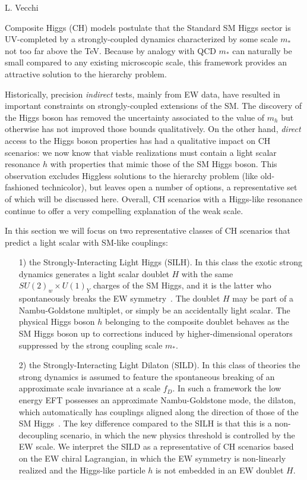 \begin{center}
 {L. Vecchi}
\end{center}
\label{sec9:CHM}

Composite Higgs (CH) models postulate that the Standard SM Higgs sector is UV-completed by a strongly-coupled dynamics characterized by some scale $m_*$ not too far above the TeV. Because by analogy with QCD $m_*$ can naturally be small compared to any existing microscopic scale, this framework provides an attractive solution to the hierarchy problem. 

Historically, precision {\emph{indirect}} tests, mainly from EW data, have resulted in important constraints on strongly-coupled extensions of the SM. The discovery of the Higgs boson has removed the uncertainty associated to the value of $m_h$ but otherwise has not improved those bounds qualitatively. On the other hand, {\emph{direct}} access to the Higgs boson properties has had a qualitative impact on CH scenarios: we now know that viable realizations must contain a light scalar resonance $h$ with properties that mimic those of the SM Higgs boson. This observation excludes Higgless solutions to the hierarchy problem (like old-fashioned technicolor), but leaves open a number of options, a representative set of which will be discussed here. Overall, CH scenarios with a Higgs-like resonance continue to offer a very compelling explanation of the weak scale.




In this section we will focus on two representative classes of CH scenarios that predict a light scalar with SM-like couplings:
\begin{itemize}
\item[1)] the Strongly-Interacting Light Higgs (SILH). In this class the exotic strong dynamics generates a light scalar doublet $H$ with the same $SU(2)_w\times U(1)_Y$ charges of the SM Higgs, and it is the latter who spontaneously breaks the EW symmetry~\cite{Kaplan:1983fs, Kaplan:1983sm}. The doublet $H$ may be part of a Nambu-Goldstone multiplet, or simply be an accidentally light scalar. The physical Higgs boson $h$ belonging to the composite doublet behaves as the SM Higgs boson up to corrections induced by higher-dimensional operators suppressed by the strong coupling scale $m_*$. 
\item[2)] the Strongly-Interacting Light Dilaton (SILD). In this class of theories the strong dynamics is assumed to feature the spontaneous breaking of an approximate scale invariance at a scale $f_D$. In such a framework the low energy EFT possesses an approximate Nambu-Goldstone mode, the dilaton, which automatically has couplings aligned along the direction of those of the SM Higgs~\cite{Goldberger:2008zz}. The key difference compared to the SILH is that this is a non-decoupling scenario, in which the new physics threshold is controlled by the EW scale. We interpret the SILD as a representative of CH scenarios based on the EW chiral Lagrangian, in which the EW symmetry is non-linearly realized and the Higgs-like particle $h$ is not embedded in an EW doublet $H$. 
\end{itemize}



